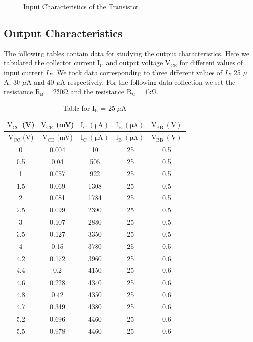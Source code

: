 \documentclass[12pt]{article}
\begin{document}
\begin{figure}[H]
    \centering
    
    \caption{Input Characteristics of the Transistor}
\end{figure}

\subsection{Output Characteristics}
The following tables contain data for studying the output characteristics. Here we tabulated the collector current $\mathrm{I_C}$ and output voltage $\mathrm{V_{CE}}$ for different values of input current $I_B$. We took data corresponding to three different values of $I_B$ 25 $\mu$A, 30 $\mu$A and 40 $\mu$A respectively. For the following data collection we set the resistance \( \mathrm{R_B = 220 \Omega }\) and the resistance \( \mathrm{R_C = 1 k \Omega}\).

\begin{longtable}[H]{|c|c|c|c|c|}
    \caption{Table for \( \mathrm{I_B}\) = 25 \( \mu \)A }
    \endfirsthead
    \hline   
    $\mathrm{V_{CC}}$ (V) & $\mathrm{V_{CE}}$ (mV) & $\mathrm{I_C \ (\mu A)}$ & $\mathrm{I_B \ (\mu A)}$ & $\mathrm{V_{BB} \ (V)}$ \\ \hline \hline
    \endhead 
    \hline   
    $\mathrm{V_{CC}}$ (V) & $\mathrm{V_{CE}}$ (mV) & $\mathrm{I_C \ (\mu A)}$ & $\mathrm{I_B \ (\mu A)}$ & $\mathrm{V_{BB} \ (V)}$ \\ \hline \hline
       0 & 0.004 & 10 & 25 & 0.5 \\ \hline
       0.5 & 0.04 & 506 & 25 & 0.5 \\ \hline
       1 & 0.057 & 922 & 25 & 0.5 \\ \hline
       1.5 & 0.069 & 1308 & 25 & 0.5 \\ \hline
       2 & 0.081 & 1784 & 25 & 0.5 \\ \hline
       2.5 & 0.099 & 2390 & 25 & 0.5 \\ \hline
       3 & 0.107 & 2880 & 25 & 0.5 \\ \hline
       3.5 & 0.127 & 3350 & 25 & 0.5 \\ \hline
       4 & 0.15 & 3780 & 25 & 0.5 \\ \hline
       4.2 & 0.172 & 3960 & 25 & 0.6 \\ \hline
       4.4 & 0.2 & 4150 & 25 & 0.6 \\ \hline
       4.6 & 0.228 & 4340 & 25 & 0.6 \\ \hline
       4.8 & 0.42 & 4350 & 25 & 0.6 \\ \hline
       4.7 & 0.349 & 4380 & 25 & 0.6 \\ \hline
       5.2 & 0.696 & 4460 &	25 & 0.6 \\ \hline
       5.5 & 0.978 & 4460 &	25 & 0.6 \\ \hline
\end{longtable}
\end{document}
